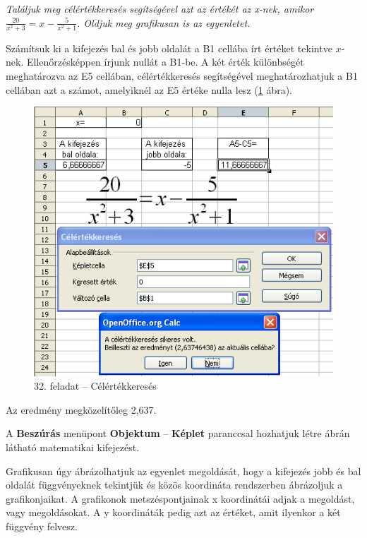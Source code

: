 \textit{Találjuk meg célértékkeresés segítségével azt az
értékét az x-nek, amikor }
$\frac{20}{x^{2}+3}=x-\frac{5}{x^{2}+1}$\textit{.  Oldjuk meg
grafikusan is az egyenletet.}

Számítsuk ki a kifejezés bal és jobb oldalát a B1 cellába
írt értéket tekintve $x$-nek. Ellenőrzésképpen
írjunk nullát a B1-be. A két érték különbségét
meghatározva az E5 cellában, célértékkeresés
segítségével meghatározhatjuk a B1 cellában azt a számot,
amelyiknél az E5 értéke nulla lesz (\ref{32-feladatCélérték} ábra).

\begin{figure}[!h]
\begin{center}
\includegraphics[width=12.674cm]{oocalcv2-img141.png}
\caption{32. feladat --  Célértékkeresés}\label{32-feladatCélérték}
\end{center}
\end{figure}

Az eredmény megközelítőleg 2,637. 

A \textbf{Beszúrás} menüpont \textbf{Objektum} --  \textbf{Képlet}
paranccsal hozhatjuk létre  ábrán látható
matematikai kifejezést.

Grafikusan úgy ábrázolhatjuk az egyenlet megoldását, hogy a
kifejezés jobb és bal oldalát függvényeknek tekintjük és
közös koordináta rendszerben ábrázoljuk a grafikonjaikat. A
grafikonok  metszéspontjainak x koordinátái adjak a megoldást,
vagy megoldásokat. A y koordináták pedig azt az értéket, amit
ilyenkor a két függvény felvesz.

